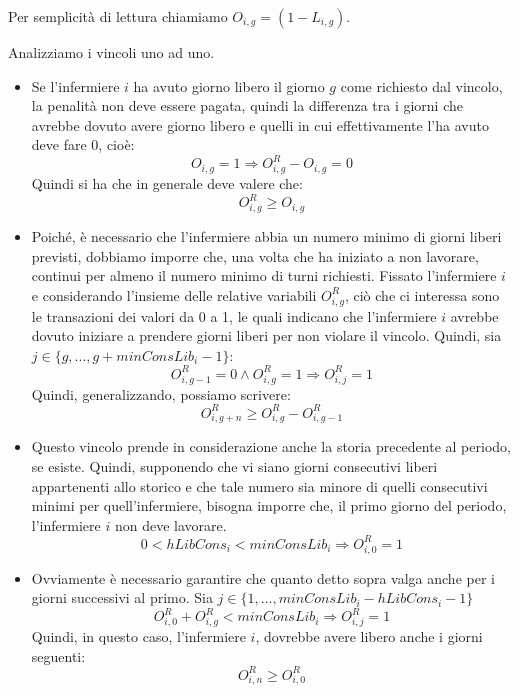 Per semplicità di lettura chiamiamo $O_{i, g} = (1-L_{i, g})$.

Analizziamo i vincoli uno ad uno.
\begin{itemize}
\item Se l'infermiere $i$ ha avuto giorno libero il giorno $g$ come richiesto dal vincolo, la penalità non deve essere pagata, quindi la differenza tra i giorni che avrebbe dovuto avere giorno libero e quelli in cui effettivamente l'ha avuto deve fare 0, cioè:
\begin{equation}
O_{i,g} = 1 \Longrightarrow O_{i,g}^R - O_{i,g} = 0
\end{equation}
Quindi si ha che in generale deve valere che:
\begin{equation}
O_{i,g}^R \geq O_{i,g}
\end{equation}

\item Poiché, è necessario che l'infermiere abbia un numero minimo di giorni liberi previsti, dobbiamo imporre che, una volta che ha iniziato a non lavorare, continui per almeno il numero minimo di turni richiesti.
Fissato l'infermiere $i$  e considerando l'insieme delle relative variabili $O_{i,g}^R$, ciò che ci interessa sono le transazioni dei valori da 0 a 1, le quali indicano che l'infermiere $i$ avrebbe dovuto iniziare a prendere giorni liberi per non violare il vincolo. Quindi, sia $j \in \{g,...,g + minConsLib_i - 1\}$:
\begin{equation}
O_{i,g-1}^R = 0 \wedge O_{i,g}^R = 1 \Longrightarrow O_{i,j}^R = 1
\end{equation}
Quindi, generalizzando, possiamo scrivere:
\begin{equation}
O_{i,g+n}^R \geq O_{i,g}^R - O_{i,g-1}^R
\end{equation}

\item Questo vincolo prende in considerazione anche la storia precedente al periodo, se esiste. Quindi, supponendo che vi siano giorni consecutivi liberi appartenenti allo storico e che tale numero sia minore di quelli consecutivi minimi per quell'infermiere, bisogna imporre che, il primo giorno del periodo, l'infermiere $i$ non deve lavorare. 
\begin{equation}
0 < hLibCons_i < minConsLib_i \Longrightarrow O_{i,0}^R = 1
\end{equation}

\item Ovviamente è necessario garantire che quanto detto sopra valga anche per i giorni successivi al primo. Sia $j \in \{1,..., minConsLib_i - hLibCons_i - 1\}$
\begin{equation}
O_{i,0}^R + O_{i,g}^R < minConsLib_i \Longrightarrow  O_{i,j}^R = 1
\end{equation}
Quindi, in questo caso, l'infermiere $i$, dovrebbe avere libero anche i giorni seguenti:
\begin{equation}
O_{i,n}^R \geq O_{i,0}^R
\end{equation}
\end{itemize}

